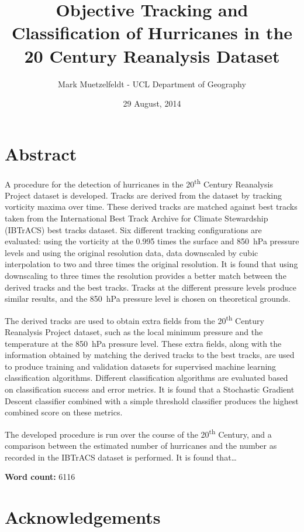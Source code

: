 \documentclass[pdftex,12pt,a4paper]{report}
\title{Objective Tracking and Classification of Hurricanes in the 20\ts{th} Century Reanalysis Dataset}
\author{Mark Muetzelfeldt - UCL Department of Geography}
\date{29 August, 2014}
\newcommand{\ts}{\textsuperscript}
\begin{document}


\onehalfspacing
\section*{Abstract}

A procedure for the detection of hurricanes in the 20\ts{th} Century Reanalysis Project dataset is
developed. Tracks are derived from the dataset by tracking vorticity maxima over time. These derived
tracks are matched against best tracks taken from the International Best Track Archive for Climate
Stewardship (IBTrACS) best tracks dataset. Six different tracking configurations are evaluated:
using the vorticity at the 0.995 times the surface and \SI{850}{hPa} pressure levels and using the
original resolution data, data downscaled by cubic interpolation to two and three times the original
resolution. It is found that using downscaling to three times the resolution provides a better match
between the derived tracks and the best tracks. Tracks at the different pressure levels produce
similar results, and the \SI{850}{hPa} pressure level is chosen on theoretical grounds.

The derived tracks are used to obtain extra fields from the 20\ts{th} Century Reanalysis
Project dataset, such as the local minimum pressure and the temperature at the \SI{850}{hPa}
pressure level. These extra fields, along with the information obtained by matching the derived
tracks to the best tracks, are used to produce training and validation datasets for supervised
machine learning classification algorithms. Different classification algorithms are evaluated based
on classification success and error metrics. It is found that a Stochastic Gradient Descent
classifier combined with a simple threshold classifier produces the highest combined score on these
metrics.

The developed procedure is run over the course of the 20\ts{th} Century, and a comparison between
the estimated number of hurricanes and the number as recorded in the IBTrACS dataset is performed.
It is found that\dots

\begin{center}
\textbf{Word count:} 6116 %
\end{center}

\section*{Acknowledgements}
\end{document}
